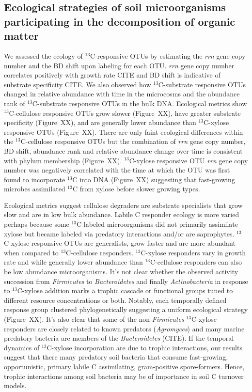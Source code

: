 \subsection{Ecological strategies of soil microorganisms participating in the
decomposition of organic matter}
We assessed the ecology of $^{13}$C-responsive OTUs by estimating the
\textit{rrn} gene copy number and the BD shift upon labeling for each OTU.
\textit{rrn} gene copy number correlates positively with growth rate CITE and
BD shift is indicative of substrate specificity CITE. We also observed how
$^{13}$C-substrate responsive OTUs changed in relative abundance with time in
the microcosms and the abundance rank of $^{13}$C-substrate responsive OTUs in
the bulk DNA. Ecological metrics show $^{13}$C-cellulose responsive OTUs grow
slower (Figure~XX), have greater substrate specificity (Figure~XX), and are
generally lower abundance than $^{13}$C-xylose responsive OTUs (Figure~XX).
There are only faint ecological differences within the $^{13}$C-cellulose
responsive OTUs but the combination of \textit{rrn} gene copy number, BD shift,
abundance rank and relative abundance change over time is consistent with
phylum membership (Figure~XX). $^{13}$C-xylose responsive OTU \textit{rrn} gene
copy number was negatively correlated with the time at which the OTU was first
found to incorporate $^{13}$C into DNA (Figure~XX) suggesting that fast-growing
microbes assimilated $^{13}$C from xylose before slower growing types.  

Ecological metrics suggest cellulose degraders are substrate specialists that
grow slow and are in low bulk abundance. Labile C responder ecology is more
varied perhaps because some $^{13}$C labeled microorganisms did not primarily
assimilate xylose but became labeled via predatory interactions and/or are
saprophytes. $^{13}$C-xylose responsive OTUs are generalists, grow faster and
are more abundant when compared to $^{13}$C-cellulose responders.
$^{13}$C-xylose responders vary in growth rate and while generally lower
abundance than $^{13}$C-cellulose responders can also be low abundance
microorganisms. It's not clear whether the observed activity succession from
\textit{Firmicutes} to \textit{Bacteroidetes} and finally
\textit{Actinobacteria} in response to $^{13}$C-xylose addition marks a trophic
cascade or functional groups tuned to different resource concentrations or
both. Notably, each temporally defined response group clustered
phylogenetically suggesting a uniform ecological strategy
(Figure~XX). It's also clear that some of the non-\textit{Firmicutes}
$^{13}$C-xylose responders are closely related to known predators
(\textit{Agromyces}) and many marine predatory bacteria are members of the
\textit{Bacteroidetes} (CITE). If the temporal dynamics of $^{13}$C-xylose
incorporation are due to trophic interactions, our results suggest that there
many predatory soil bacteria that consume fast-growing, opportunistic, primary
labile C assimilating, gram-positive spore-formers. Hence, trophic interactions
among soil bacteria may be of importance in soil C turnover models.

